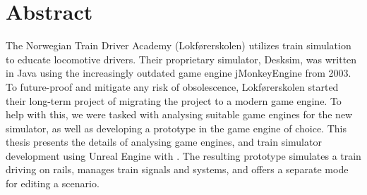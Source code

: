 \chapter*{Abstract}





The Norwegian Train Driver Academy (Lokførerskolen) utilizes train simulation to educate locomotive drivers. Their proprietary simulator, Desksim, was written in Java using the increasingly outdated game engine jMonkeyEngine from 2003. To future-proof and mitigate any risk of obsolescence, Lokførerskolen started their long-term project of migrating the project to a modern game engine. To help with this, we were tasked
with analysing suitable game engines for the new simulator, as well as developing a prototype in the game engine of choice. This thesis presents the details of analysing game engines, and train simulator development using Unreal Engine with \cpp. The resulting prototype simulates a train driving on rails, manages train signals and systems, and offers a separate mode for editing a scenario.



 

